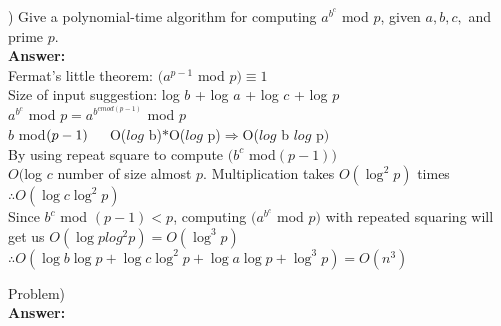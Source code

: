 \documentclass{article}
\begin{document}
\vspace{.3in}
) Give a polynomial-time algorithm for computing $a^{b^c}$ mod $p$, given $a, b, c,$ 
\indent and prime $p$. \\
\vspace{.1in}
{\bf Answer:} \\
\indent Fermat's little theorem: $(a^{p-1}$ mod $p) \equiv 1$ \\
\indent Size of input suggestion: log $b$ + log $a$ + log $c$ + log $p$ \\

\indent $a^{b^c}$ mod $p = a^{b^{c mod(p - 1)}}$ mod $p$ \\
\indent $b$ mod$(p - 1) \\ 
\indent $O($log$ b)$ * $O($log$ p)$ \Rightarrow $O($log$ b $ log$ p$)$ \\

\indent By using repeat square to compute $(b^c$ mod$(p - 1))$ \\
\indent $O($log $ c$ number of size almost $p$. Multiplication takes $O(\log^2 p)$ times \\

\indent $\therefore O(\log c \log^2 p)$ \\

\indent Since $b^c$ mod $(p - 1) < p$, computing $(a^{b^c}$ mod $p)$ with repeated squaring will get us $O(\log p log^2 p) = O(\log^3 p)$ \\

\indent $\therefore O(\log b \log p + \log c \log^2 p + \log a\log p + \log^3 p) = O(n^3)$

\vspace{.3in}
\noindent Problem) \\
\vspace{.1in}
{\bf Answer:} \\
\end{document}
